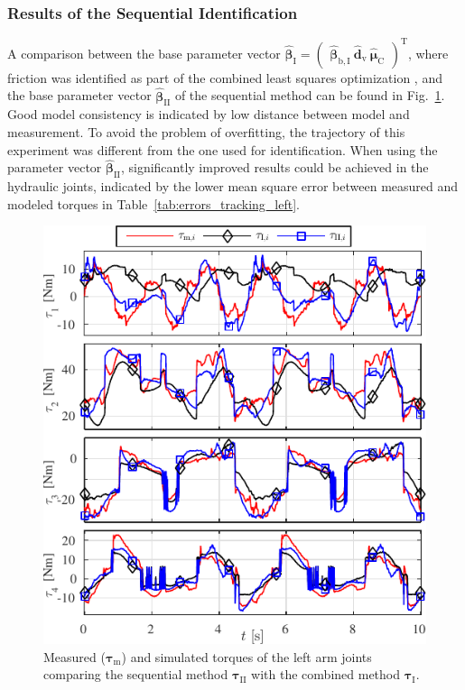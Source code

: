 \subsubsection{Results of the Sequential Identification}

A comparison between the base parameter vector $\hat{\bm{\beta}}_{\mathrm{I}} = \begin{pmatrix} \hat{\bm{\beta}}_\mathrm{b,I} \ \hat{\bm{d}}_\mathrm{v} \ \hat{\bm{\mu}}_\mathrm{C} \end{pmatrix}^{\mathrm{T}}$, where friction was identified as part of the combined least squares optimization \cite{SpVdTh14}, and the base parameter vector $\hat{\bm{\beta}}_{\mathrm{II}}$ of the sequential method can be found in Fig.~\ref{fig:ident_torque_compare}.
Good model consistency is indicated by low distance between model and measurement.
To avoid the problem of overfitting, the trajectory of this experiment was different from the one used for identification.
When using the parameter vector $\hat{\bm{\beta}}_{\mathrm{II}}$, significantly improved results could be achieved in the hydraulic joints, indicated by the lower mean square error between measured and modeled torques in Table~\ref{tab:errors_tracking_left}.

\begin{figure}
\centering
\includegraphics{./figures/Identification/atlas5_plot_torque_ident_MPV_left_IROS}
\caption{Measured ($\bm{\tau}_\mathrm{m}$) and simulated torques of the left arm joints comparing the sequential method $\bm{\tau}_{\mathrm{\mathrm{II}}}$ with the combined method $\bm{\tau}_{\mathrm{\mathrm{I}}}$.}
\label{fig:ident_torque_compare}
\SkipBeforeText
\end{figure}

